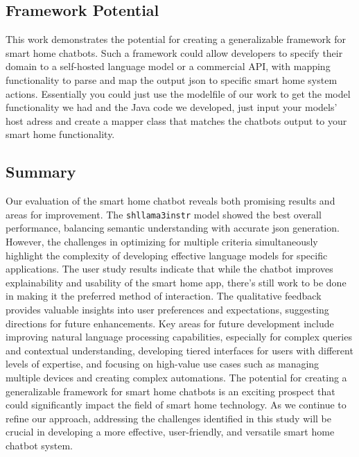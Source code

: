 \subsection{Framework Potential}
This work demonstrates the potential for creating a generalizable framework for smart home chatbots. Such a framework could allow developers to specify their domain to a self-hosted language model or a commercial API, with mapping functionality to parse and map the output \gls{json} to specific smart home system actions. Essentially you could just use the modelfile of our work to get the model functionality we had and the Java code we developed, just input your models' host adress and create a mapper class that matches the chatbots output to your smart home functionality.

\subsection{Summary}
Our evaluation of the smart home chatbot reveals both promising results and areas for improvement. The \texttt{shllama3instr} model showed the best overall performance, balancing semantic understanding with accurate \gls{json} generation. However, the challenges in optimizing for multiple criteria simultaneously highlight the complexity of developing effective language models for specific applications.
The user study results indicate that while the chatbot improves explainability and usability of the smart home app, there's still work to be done in making it the preferred method of interaction. The qualitative feedback provides valuable insights into user preferences and expectations, suggesting directions for future enhancements.
Key areas for future development include improving natural language processing capabilities, especially for complex queries and contextual understanding, developing tiered interfaces for users with different levels of expertise, and focusing on high-value use cases such as managing multiple devices and creating complex automations.
The potential for creating a generalizable framework for smart home chatbots is an exciting prospect that could significantly impact the field of smart home technology. As we continue to refine our approach, addressing the challenges identified in this study will be crucial in developing a more effective, user-friendly, and versatile smart home chatbot system.

